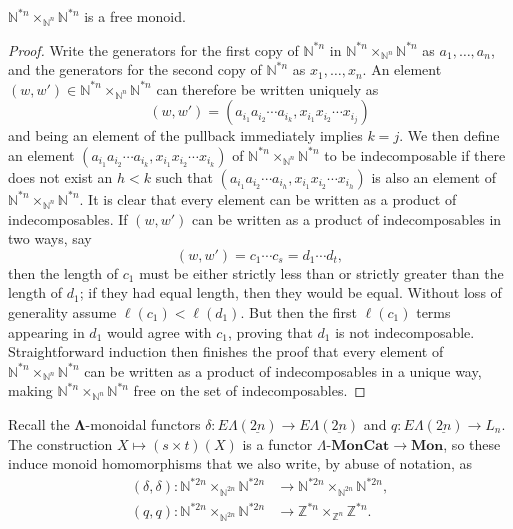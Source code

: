 \documentclass{amsbook} %
\newcommand{\mb}{\mathbf}
\newcommand{\ML}{\mathbf{\Lambda}}
\newcommand{\ELnn}{E\Lambda(\underline{2n})}
\newcommand{\lmc}{\Lambda\mbox{-}\mb{MonCat}}
\newcommand{\mon}{\ensuremath{\mb{Mon}}}
\numberwithin{section}{chapter}
\begin{document}
\begin{lem}\label{freemon} $\mathbb{N}^{\ast n} \times_{\mathbb{N}^n} \mathbb{N}^{\ast n}$ is a free monoid.
\end{lem}
\begin{proof}
Write the generators for the first copy of $\mathbb{N}^{\ast n}$ in $\mathbb{N}^{\ast n} \times_{\mathbb{N}^n} \mathbb{N}^{\ast n}$ as $a_1, \ldots, a_n$, and the generators for the second copy of $\mathbb{N}^{\ast n}$ as $x_1, \ldots, x_n$. An element $(w,w') \in \mathbb{N}^{\ast n} \times_{\mathbb{N}^n} \mathbb{N}^{\ast n}$ can therefore be written uniquely as
  \[
    (w,w') = (a_{i_1} a_{i_2} \cdots a_{i_k}, x_{i_1} x_{i_2} \cdots x_{i_j})
  \]
and being an element of the pullback immediately implies $k=j$. We then define an element $ (a_{i_1} a_{i_2} \cdots a_{i_k}, x_{i_1} x_{i_2} \cdots x_{i_k})$ of $\mathbb{N}^{\ast n} \times_{\mathbb{N}^n} \mathbb{N}^{\ast n}$ to be indecomposable if there does not exist an $h < k$ such that $ (a_{i_1} a_{i_2} \cdots a_{i_h}, x_{i_1} x_{i_2} \cdots x_{i_h})$ is also an element of $\mathbb{N}^{\ast n} \times_{\mathbb{N}^n} \mathbb{N}^{\ast n}$. It is clear that every element can be written as a product of indecomposables. If $(w,w')$ can be written as a product of indecomposables in two ways, say 
  \[
    (w,w') = c_1 \cdots c_s = d_1 \cdots d_t,
  \]
then the length  of $c_1$ must be either strictly less than or strictly greater than the length of $d_1$; if they had equal length, then they would be equal. Without loss of generality assume $\ell(c_1) < \ell(d_1)$. But then the first $\ell(c_1)$ terms appearing in $d_1$ would agree with $c_1$, proving that $d_1$ is not indecomposable. Straightforward induction then finishes the proof that every element of $\mathbb{N}^{\ast n} \times_{\mathbb{N}^n} \mathbb{N}^{\ast n}$ can be written as a product of indecomposables in a unique way, making $\mathbb{N}^{\ast n} \times_{\mathbb{N}^n} \mathbb{N}^{\ast n}$ free on the set of indecomposables.
\end{proof}

Recall the $\ML$-monoidal functors $\delta \colon \ELnn \rightarrow \ELnn$ and $q \colon \ELnn \rightarrow L_n$. The construction $X \mapsto (s \times t)(X)$ is a functor $\lmc \rightarrow \mon$, so these induce monoid homomorphisms that we also write, by abuse of notation, as 
  \begin{align*}
    (\delta, \delta) \colon  \mathbb{N}^{\ast 2n} \times_{\mathbb{N}^{2n}} \mathbb{N}^{\ast 2n} &\rightarrow \mathbb{N}^{\ast 2n} \times_{\mathbb{N}^{2n}} \mathbb{N}^{\ast 2n}, \\
    (q, q) \colon  \mathbb{N}^{\ast 2n} \times_{\mathbb{N}^{2n}} \mathbb{N}^{\ast 2n} &\rightarrow \mathbb{Z}^{\ast n} \times_{\mathbb{Z}^n} \mathbb{Z}^{\ast n}. 
  \end{align*}
\end{document}
